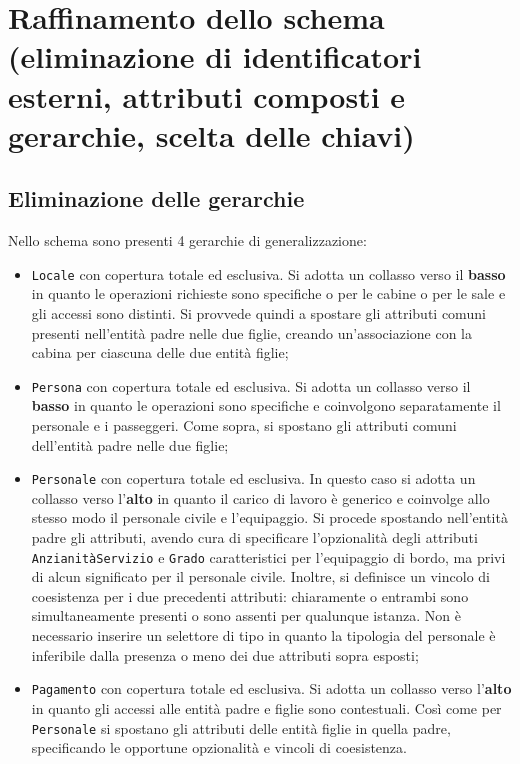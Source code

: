 \documentclass[a4paper, titlepage]{report}
\begin{document}
\newpage

\section*{Raffinamento dello schema (eliminazione di identificatori esterni, attributi composti e gerarchie, scelta delle chiavi) }

\subsection*{Eliminazione delle gerarchie}
Nello schema sono presenti 4 gerarchie di generalizzazione:
\begin{itemize}
    \item \texttt{Locale} con copertura totale ed esclusiva. Si adotta un collasso verso il \textbf{basso} in quanto le operazioni richieste sono specifiche o per le cabine o per le sale e gli accessi sono distinti. Si provvede quindi a spostare gli attributi comuni presenti nell'entità padre nelle due figlie, creando un'associazione con la cabina per ciascuna delle due entità figlie;
    \item \texttt{Persona} con copertura totale ed esclusiva. Si adotta un collasso verso il \textbf{basso} in quanto le operazioni sono specifiche e coinvolgono separatamente il personale e i passeggeri. Come sopra, si spostano gli attributi comuni dell'entità padre nelle due figlie;
    \item \texttt{Personale} con copertura totale ed esclusiva. In questo caso si adotta un collasso verso l'\textbf{alto} in quanto il carico di lavoro è generico e coinvolge allo stesso modo il personale civile e l'equipaggio. Si procede spostando nell'entità padre gli attributi, avendo cura di specificare l'opzionalità degli attributi \texttt{AnzianitàServizio} e \texttt{Grado} caratteristici per l'equipaggio di bordo, ma privi di alcun significato per il personale civile. Inoltre, si definisce un vincolo di coesistenza per i due precedenti attributi: chiaramente o entrambi sono simultaneamente presenti o sono assenti per qualunque istanza. Non è necessario inserire un selettore di tipo in quanto la tipologia del personale è inferibile dalla presenza o meno dei due attributi sopra esposti;
    \item \texttt{Pagamento} con copertura totale ed esclusiva. Si adotta un collasso verso l'\textbf{alto} in quanto gli accessi alle entità padre e figlie sono contestuali. Così come per \texttt{Personale} si spostano gli attributi delle entità figlie in quella padre, specificando le opportune opzionalità e vincoli di coesistenza. 
\end{itemize}
\end{document}
